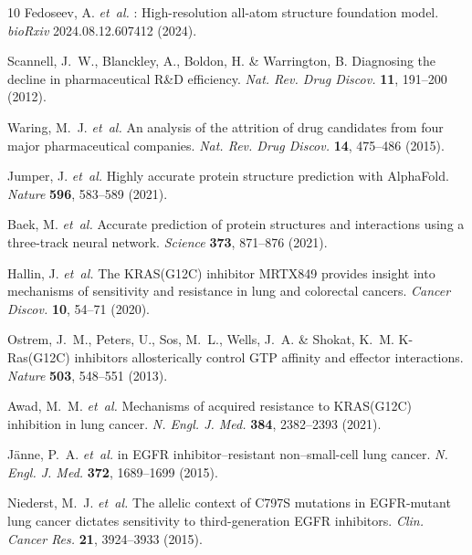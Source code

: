 \documentclass[11pt,a4paper]{article}
\begin{document}
\begin{thebibliography}{10}
Fedoseev, A. \emph{et~al.}
: High-resolution all-atom structure foundation model.
\newblock \emph{bioRxiv} 2024.08.12.607412 (2024).


Scannell, J.~W., Blanckley, A., Boldon, H. \& Warrington, B.
\newblock Diagnosing the decline in pharmaceutical {R\&D} efficiency.
\newblock \emph{Nat. Rev. Drug Discov.} \textbf{11}, 191--200 (2012).

Waring, M.~J. \emph{et~al.}
\newblock An analysis of the attrition of drug candidates from four major pharmaceutical companies.
\newblock \emph{Nat. Rev. Drug Discov.} \textbf{14}, 475--486 (2015).

Jumper, J. \emph{et~al.}
\newblock Highly accurate protein structure prediction with {AlphaFold}.
\newblock \emph{Nature} \textbf{596}, 583--589 (2021).

Baek, M. \emph{et~al.}
\newblock Accurate prediction of protein structures and interactions using a three-track neural network.
\newblock \emph{Science} \textbf{373}, 871--876 (2021).

Hallin, J. \emph{et~al.}
\newblock The {KRAS(G12C)} inhibitor {MRTX849} provides insight into mechanisms of sensitivity and resistance in lung and colorectal cancers.
\newblock \emph{Cancer Discov.} \textbf{10}, 54--71 (2020).

Ostrem, J.~M., Peters, U., Sos, M.~L., Wells, J.~A. \& Shokat, K.~M.
\newblock K-{Ras(G12C)} inhibitors allosterically control {GTP} affinity and effector interactions.
\newblock \emph{Nature} \textbf{503}, 548--551 (2013).

Awad, M.~M. \emph{et~al.}
\newblock Mechanisms of acquired resistance to {KRAS(G12C)} inhibition in lung cancer.
\newblock \emph{N. Engl. J. Med.} \textbf{384}, 2382--2393 (2021).

J{\"a}nne, P.~A. \emph{et~al.}
 in {EGFR} inhibitor--resistant non--small-cell lung cancer.
\newblock \emph{N. Engl. J. Med.} \textbf{372}, 1689--1699 (2015).

Niederst, M.~J. \emph{et~al.}
\newblock The allelic context of {C797S} mutations in {EGFR-mutant} lung cancer dictates sensitivity to third-generation {EGFR} inhibitors.
\newblock \emph{Clin. Cancer Res.} \textbf{21}, 3924--3933 (2015).


\end{thebibliography}
\end{document}
